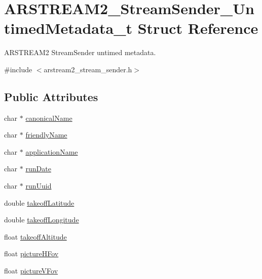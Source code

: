\hypertarget{struct_a_r_s_t_r_e_a_m2___stream_sender___untimed_metadata__t}{}\section{A\+R\+S\+T\+R\+E\+A\+M2\+\_\+\+Stream\+Sender\+\_\+\+Untimed\+Metadata\+\_\+t Struct Reference}
\label{struct_a_r_s_t_r_e_a_m2___stream_sender___untimed_metadata__t}


A\+R\+S\+T\+R\+E\+A\+M2 Stream\+Sender untimed metadata.  




{\ttfamily \#include $<$arstream2\+\_\+stream\+\_\+sender.\+h$>$}

\subsection*{Public Attributes}
\begin{DoxyCompactItemize}
\item 
char $\ast$ \hyperlink{struct_a_r_s_t_r_e_a_m2___stream_sender___untimed_metadata__t_ab87b1f4e4a228735cc1e10003d5138ee}{canonical\+Name}
\item 
char $\ast$ \hyperlink{struct_a_r_s_t_r_e_a_m2___stream_sender___untimed_metadata__t_af6f99a2f633deb464c995972b8d2fab0}{friendly\+Name}
\item 
char $\ast$ \hyperlink{struct_a_r_s_t_r_e_a_m2___stream_sender___untimed_metadata__t_a67ae4927a29715322bdadba5e9561ca1}{application\+Name}
\item 
char $\ast$ \hyperlink{struct_a_r_s_t_r_e_a_m2___stream_sender___untimed_metadata__t_a182d05cdad32e7e21331d32f529d0eca}{run\+Date}
\item 
char $\ast$ \hyperlink{struct_a_r_s_t_r_e_a_m2___stream_sender___untimed_metadata__t_a31155772820542e6e871a3fd7c883de2}{run\+Uuid}
\item 
double \hyperlink{struct_a_r_s_t_r_e_a_m2___stream_sender___untimed_metadata__t_a88522bc343d9ccb7b6279dcd87f23bc7}{takeoff\+Latitude}
\item 
double \hyperlink{struct_a_r_s_t_r_e_a_m2___stream_sender___untimed_metadata__t_a92622087dc7bd77278590ef76be4b6b9}{takeoff\+Longitude}
\item 
float \hyperlink{struct_a_r_s_t_r_e_a_m2___stream_sender___untimed_metadata__t_ad380d72daa3b0c93215fd48a10c8213d}{takeoff\+Altitude}
\item 
float \hyperlink{struct_a_r_s_t_r_e_a_m2___stream_sender___untimed_metadata__t_a9888a31da107625fc2c7ce39cdc464f2}{picture\+H\+Fov}
\item 
float \hyperlink{struct_a_r_s_t_r_e_a_m2___stream_sender___untimed_metadata__t_a526523c62c71a48581af34e07b8ef722}{picture\+V\+Fov}
\end{DoxyCompactItemize}


